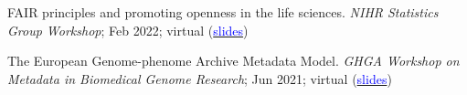 \documentclass[margin,line]{res}
\begin{document}
\begin{resume}

FAIR principles and promoting openness in the life sciences. {\em NIHR Statistics Group Workshop}; Feb 2022; virtual (\href{https://docs.google.com/presentation/d/1BNdhj_Ny7qJ84xmoUuzqIicYXF3UwwcGdJTLtyZkV5I/edit?usp=sharing}{\textcolor{blue}{slides}})

The European Genome-phenome Archive Metadata Model. {\em GHGA Workshop on Metadata in Biomedical Genome Research}; Jun 2021; virtual (\href{https://docs.google.com/presentation/d/14x9PNs3j5mNZWIHBW9k6aiJUekiLYsrbrkpaMihB4ko/edit?usp=sharing}{\textcolor{blue}{slides}})









\end{resume}
\end{document}
